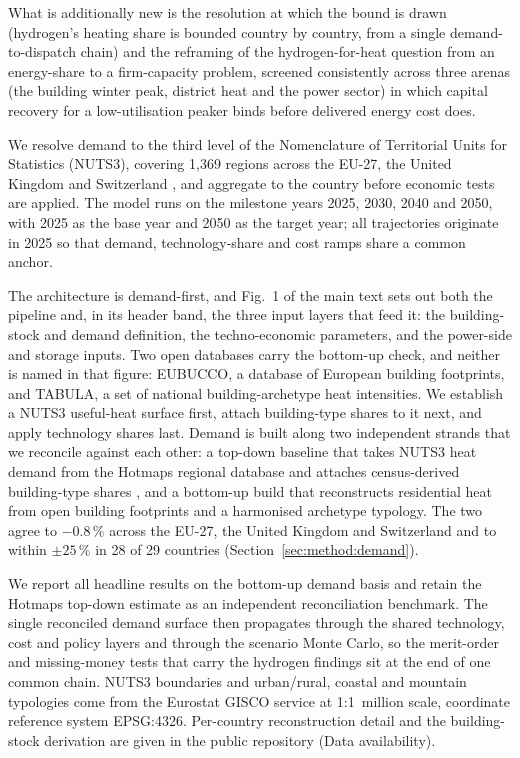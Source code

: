 What is additionally new is the resolution at which the bound is drawn (hydrogen's heating share is bounded country by country, from a single
demand-to-dispatch chain) and the
reframing of the hydrogen-for-heat question from an energy-share to a firm-capacity
problem, screened consistently across three arenas (the building winter peak, district
heat and the power sector) in which capital recovery for a low-utilisation peaker binds
before delivered energy cost does.

We resolve demand to the third level of the Nomenclature of Territorial Units for
Statistics (NUTS3), covering 1{,}369 regions across the EU-27, the United Kingdom
and Switzerland \citep{Hotmaps2020}, and aggregate to the country before economic
tests are applied. The model runs on the milestone years 2025, 2030, 2040 and 2050,
with 2025 as the base year and 2050 as the target year; all trajectories originate
in 2025 so that demand, technology-share and cost ramps share a common anchor.

The architecture is demand-first, and Fig.~1 of the main text sets out both the pipeline and, in its header band, the three input layers that feed it: the building-stock and demand definition, the techno-economic parameters, and the power-side and storage inputs. Two open databases carry the bottom-up check, and neither is named in that figure: EUBUCCO, a database of European building footprints, and TABULA, a set of national building-archetype heat intensities. We establish a NUTS3
useful-heat surface first, attach building-type shares to it next, and apply technology
shares last. Demand is built along two independent strands that we reconcile against
each other: a top-down baseline that takes NUTS3 heat demand from the Hotmaps regional
database \citep{Hotmaps2020} and attaches census-derived building-type shares
\citep{Eurostat2021census,ONS2021TS044}, and a bottom-up build that reconstructs
residential heat from open building footprints and a harmonised archetype typology. The
two agree to $-0.8\,\%$ across the EU-27, the United Kingdom and Switzerland and to
within $\pm 25\,\%$ in 28 of 29 countries (Section~\ref{sec:method:demand}).

We report all headline results on the bottom-up demand basis and retain the Hotmaps
top-down estimate as an independent reconciliation benchmark. The single reconciled
demand surface then propagates through the shared technology, cost and policy layers and
through the scenario Monte Carlo, so the merit-order and missing-money tests that carry
the hydrogen findings sit at the end of one common chain. NUTS3 boundaries and
urban/rural, coastal and mountain typologies come from the Eurostat GISCO service
\citep{EurostatGISCO2021} at 1:1~million scale, coordinate reference system EPSG:4326.
Per-country reconstruction detail and the building-stock derivation are given in the
public repository (Data availability).


